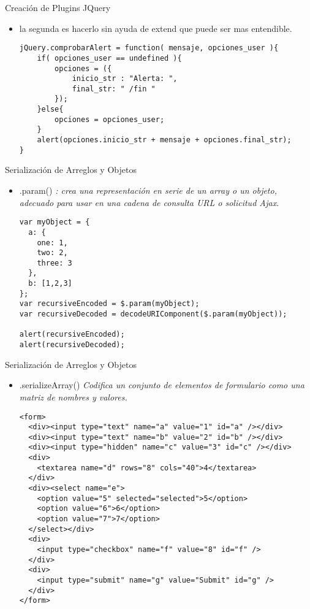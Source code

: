 \begin{frame}[fragile]{Creación de Plugins JQuery} %
\begin{itemize}
\item la segunda es hacerlo sin ayuda de extend que puede ser mas entendible.
\begin{lstlisting}
jQuery.comprobarAlert = function( mensaje, opciones_user ){
    if( opciones_user == undefined ){
        opciones = ({
            inicio_str : "Alerta: ",
            final_str: " /fin "
        });
    }else{
        opciones = opciones_user;
    }
    alert(opciones.inicio_str + mensaje + opciones.final_str);
}
\end{lstlisting}
\end{itemize}
\end{frame}

\begin{frame}[fragile]{Serialización de Arreglos y Objetos} %
\begin{itemize}
\item .param() \textit{ : crea una representación en serie de un array o un objeto, adecuado para usar en una cadena de consulta URL o solicitud Ajax.}
\begin{lstlisting}
var myObject = {
  a: {
    one: 1, 
    two: 2, 
    three: 3
  }, 
  b: [1,2,3]
};
var recursiveEncoded = $.param(myObject);
var recursiveDecoded = decodeURIComponent($.param(myObject));

alert(recursiveEncoded);
alert(recursiveDecoded);
\end{lstlisting}
\end{itemize}
\end{frame}

\begin{frame}[fragile]{Serialización de Arreglos y Objetos} %
\begin{itemize}
\item .serializeArray() \textit{Codifica un conjunto de elementos de formulario como una matriz de nombres y valores.}
\begin{lstlisting}
<form>
  <div><input type="text" name="a" value="1" id="a" /></div>
  <div><input type="text" name="b" value="2" id="b" /></div>
  <div><input type="hidden" name="c" value="3" id="c" /></div>
  <div>
    <textarea name="d" rows="8" cols="40">4</textarea>
  </div>
  <div><select name="e">
    <option value="5" selected="selected">5</option>
    <option value="6">6</option>
    <option value="7">7</option>
  </select></div>
  <div>
    <input type="checkbox" name="f" value="8" id="f" />
  </div>
  <div>
    <input type="submit" name="g" value="Submit" id="g" />
  </div>
</form>
\end{lstlisting}
\end{itemize}
\end{frame}

